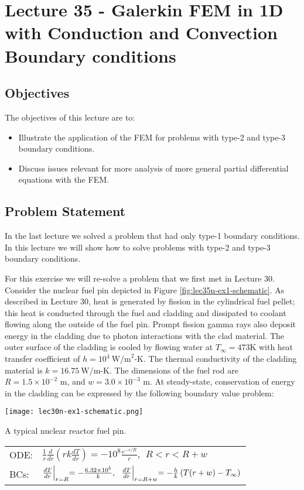 \chapter{Lecture 35 - Galerkin FEM in 1D with Conduction and Convection Boundary conditions}
\label{ch:lec35n}
\section{Objectives}
The objectives of this lecture are to:
\begin{itemize}
\item Illustrate the application of the FEM for problems with type-2 and type-3 boundary conditions.
\item Discuss issues relevant for more analysis of more general partial differential equations with the FEM.
\end{itemize}
\setcounter{lstannotation}{0}

\section{Problem Statement}
In the last lecture we solved a problem that had only type-1 boundary conditions.  In this lecture we will show how to solve problems with type-2 and type-3 boundary conditions.  

For this exercise we will re-solve a problem that we first met in Lecture 30. Consider the nuclear fuel pin depicted in Figure \ref{fig:lec35n-ex1-schematic}.  As described in Lecture 30,  heat is generated by fission in the cylindrical fuel pellet; this heat is conducted through the fuel and cladding and dissipated to coolant flowing along the outside of the fuel pin.  Prompt fission gamma rays also deposit energy in the cladding due to photon interactions with the clad material.  The outer surface of the cladding is cooled by flowing water at $T_{\infty}=473$K with heat transfer coefficient of $h=10^4\ \text{W/m}^2\text{-K}$.  The thermal conductivity of the cladding material is $k=16.75 \ \text{W/m-K}$.  The dimensions of the fuel rod are $R=1.5\times 10^{-2}\text{ m}$, and $w=3.0\times 10^{-3}\text{ m}$.  At steady-state, conservation of energy in the cladding can be expressed by the following boundary value problem:
\begin{marginfigure}
\texttt{[image: lec30n-ex1-schematic.png]}
\caption{A typical nuclear reactor fuel pin.}
\label{fig:lec35n-ex1-schematic}
\end{marginfigure}
\begin{table}[h!]
\begin{tabular}{l l}
ODE: & $\frac{1}{r}\frac{d}{dr}\left(rk\frac{dT}{dr}\right)=-10^8\frac{e^{-r/R}}{r}, \ \  R < r < R+w $ \\
BCs: & $\frac{dT}{dr}\Bigl|_{r=R}=-\frac{6.32\times 10^5}{k}, \ \ \frac{dT}{dr}\Bigl|_{r=R+w}=-\frac{h}{k}\left(T(r+w)-T_{\infty}\right)$ \\
\end{tabular}
\end{table}

